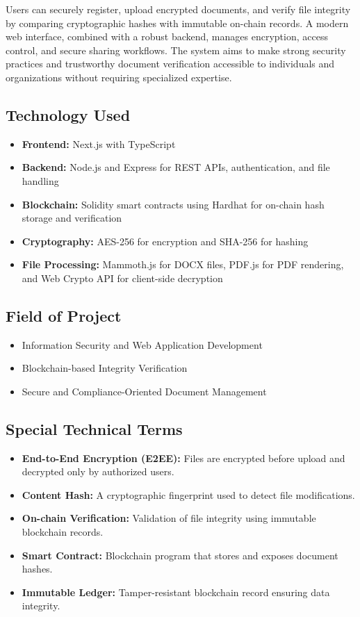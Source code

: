 \documentclass[12pt]{article}
\begin{document}
Users can securely register, upload encrypted documents, and verify file integrity by comparing cryptographic hashes with immutable on-chain records. A modern web interface, combined with a robust backend, manages encryption, access control, and secure sharing workflows\cite{conti2018}. The system aims to make strong security practices and trustworthy document verification accessible to individuals and organizations without requiring specialized expertise.

\subsection{Technology Used}

\begin{itemize}
\item \textbf{Frontend:} Next.js with TypeScript
\item \textbf{Backend:} Node.js and Express for REST APIs, authentication, and file handling
\item \textbf{Blockchain:} Solidity smart contracts using Hardhat for on-chain hash storage and verification
\item \textbf{Cryptography:} AES-256 for encryption and SHA-256 for hashing \cite{nist197}
\item \textbf{File Processing:} Mammoth.js for DOCX files, PDF.js for PDF rendering, and Web Crypto API for client-side decryption
\end{itemize}

\subsection{Field of Project}

\begin{itemize}
\item Information Security and Web Application Development
\item Blockchain-based Integrity Verification\cite{dorri2017}
\item Secure and Compliance-Oriented Document Management
\end{itemize}

\subsection{Special Technical Terms}

\begin{itemize}
\item \textbf{End-to-End Encryption (E2EE):} Files are encrypted before upload and decrypted only by authorized users.
\item \textbf{Content Hash:} A cryptographic fingerprint used to detect file modifications.
\item \textbf{On-chain Verification:} Validation of file integrity using immutable blockchain records.
\item \textbf{Smart Contract:} Blockchain program that stores and exposes document hashes.\cite{ijraset2021}
\item \textbf{Immutable Ledger:} Tamper-resistant blockchain record ensuring data integrity.
\end{itemize}
\end{document}
